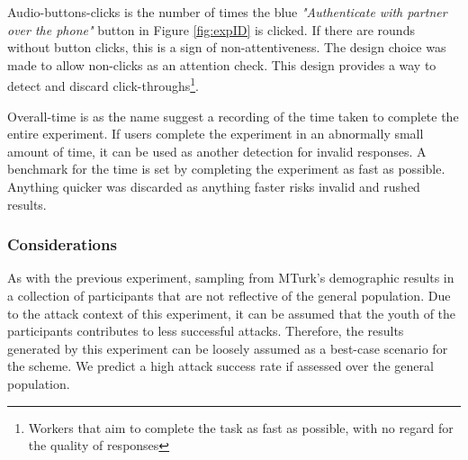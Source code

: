 Audio-buttons-clicks is the number of times the blue \textit{"Authenticate with partner over the phone"} button in Figure \ref{fig:expID} is clicked. If there are rounds without button clicks, this is a sign of non-attentiveness. The design choice was made to allow non-clicks as an attention check. This design provides a way to detect and discard click-throughs\footnote{Workers that aim to complete the task as fast as possible, with no regard for the quality of responses}. 

Overall-time is as the name suggest a recording of the time taken to complete the entire experiment. If users complete the experiment in an abnormally small amount of time, it can be used as another detection for invalid responses. A benchmark for the time is set by completing the experiment as fast as possible. Anything quicker was discarded as anything faster risks invalid and rushed results.

\subsubsection{Considerations}
As with the previous experiment, sampling from MTurk's demographic results in a collection of participants that are not reflective of the general population. Due to the attack context of this experiment, it can be assumed that the youth of the participants contributes to less successful attacks. Therefore, the results generated by this experiment can be loosely assumed as a best-case scenario for the scheme. We predict a high attack success rate if assessed over the general population.